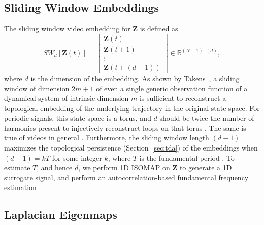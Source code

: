 \documentclass{article}
\newcommand{\mb}{\mathbf}
\begin{document}
\subsection{Sliding Window Embeddings}
\label{sec:slidingwindow}

The sliding window video embedding \cite{cao1998dynamics,traliehigh,tralie2017quasi} for $\mb{Z}$ is defined as
\begin{equation}
	SW_{d}[\mb{Z}(t)] = \left[ \begin{array}{c} \mb{Z}(t) \\ \mb{Z}(t + 1) \\ \vdots \\ \mb{Z}(t + (d-1))  \end{array} \right] \in \mathbb{R}^{(N-1)\cdot(d)},
\end{equation}
where $d$ is the dimension of the embedding. As shown by Takens~\cite{takens1981detecting}, a sliding window of dimension $2m+1$ of even a single generic observation function of a dynamical system of intrinsic dimension $m$ is sufficient to reconstruct a topological embedding of the underlying trajectory in the original state space.  For periodic signals, this state space is a torus, and $d$ should be twice the number of harmonics present to injectively reconstruct loops on that torus \cite{perea2015sliding}.  The same is true of videos in general \cite{tralie2017quasi}.  Furthermore, the sliding window length $(d-1)$ maximizes the topological persistence (Section~\ref{sec:tda}) of the embeddings when $(d-1) = k T$ for some integer $k$, where $T$ is the fundamental period \cite{perea2015sliding, tralie2017quasi}.  To estimate $T$, and hence $d$, we perform 1D ISOMAP \cite{tenenbaum2000global} on $\mb{Z}$ to generate a 1D surrogate signal, and perform an autocorrelation-based fundamental frequency estimation \cite{Mcleod05asmarter}.

\subsection{Laplacian Eigenmaps}
\label{sec:laplacian}
\end{document}
